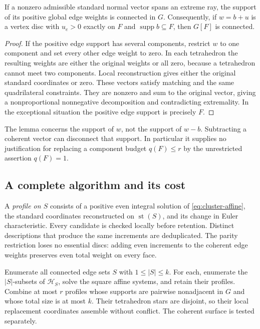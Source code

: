 \begin{lemma}\label{lem:cluster-exception}
If a nonzero admissible standard normal vector spans an extreme ray,
the support of its positive global edge weights is connected in $G$.
Consequently, if $w=b+u$ is a vertex disc with $u_e>0$ exactly on $F$
and $\operatorname{supp}b\subseteq F$, then $G[F]$ is connected.
\end{lemma}

\begin{proof}
If the positive edge support has several components, restrict $w$ to
one component and set every other edge weight to zero.  In each
tetrahedron the resulting weights are either the original weights or
all zero, because a tetrahedron cannot meet two components.  Local
reconstruction gives either the original standard coordinates or zero.
These vectors satisfy matching and the same quadrilateral constraints.
They are nonzero and sum to the original vector, giving a
nonproportional nonnegative decomposition and contradicting extremality.
In the exceptional situation the positive edge support is precisely $F$.
\end{proof}

The lemma concerns the support of $w$, not the support of $w-b$.
Subtracting a coherent vector can disconnect that support.  In
particular it supplies no justification for replacing a component budget
$q(F)\le r$ by the unrestricted assertion $q(F)=1$.

\subsection{A complete algorithm and its cost}

A \emph{profile on $S$} consists of a positive even integral solution of
\eqref{eq:cluster-affine}, the standard coordinates reconstructed on
$\operatorname{st}(S)$, and its change in Euler characteristic.  Every
candidate is checked locally before retention.  Distinct descriptions
that produce the same increments are deduplicated.  The parity
restriction loses no essential discs: adding even increments to the
coherent edge weights preserves even total weight on every face.

Enumerate all connected edge sets $S$ with $1\le |S|\le k$.  For each,
enumerate the $|S|$-subsets of $\mathcal H_S$, solve the square affine
systems, and retain their profiles.  Combine at most $r$ profiles whose
supports are pairwise nonadjacent in $G$ and whose total size is at most
$k$.  Their tetrahedron stars are disjoint, so their local replacement
coordinates assemble without conflict.  The coherent surface is tested
separately.

